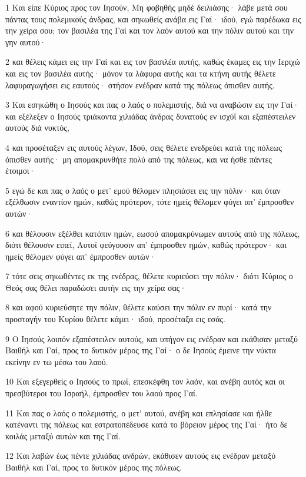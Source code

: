 \par 1 Και είπε Κύριος προς τον Ιησούν, Μη φοβηθής μηδέ δειλιάσης· λάβε μετά σου πάντας τους πολεμικούς άνδρας, και σηκωθείς ανάβα εις Γαί· ιδού, εγώ παρέδωκα εις την χείρα σου; τον βασιλέα της Γαί και τον λαόν αυτού και την πόλιν αυτού και την γην αυτού·
\par 2 και θέλεις κάμει εις την Γαί και εις τον βασιλέα αυτής, καθώς έκαμες εις την Ιεριχώ και εις τον βασιλέα αυτής· μόνον τα λάφυρα αυτής και τα κτήνη αυτής θέλετε λαφυραγωγήσει εις εαυτούς· στήσον ενέδραν κατά της πόλεως όπισθεν αυτής.
\par 3 Και εσηκώθη ο Ιησούς και πας ο λαός ο πολεμιστής, διά να αναβώσιν εις την Γαί· και εξέλεξεν ο Ιησούς τριάκοντα χιλιάδας άνδρας δυνατούς εν ισχύϊ και εξαπέστειλεν αυτούς διά νυκτός,
\par 4 και προσέταξεν εις αυτούς λέγων, Ιδού, σεις θέλετε ενεδρεύει κατά της πόλεως όπισθεν αυτής· μη απομακρυνθήτε πολύ από της πόλεως, και να ήσθε πάντες έτοιμοι·
\par 5 εγώ δε και πας ο λαός ο μετ' εμού θέλομεν πλησιάσει εις την πόλιν· και όταν εξέλθωσιν εναντίον ημών, καθώς πρότερον, τότε ημείς θέλομεν φύγει απ' έμπροσθεν αυτών·
\par 6 και θέλουσιν εξέλθει κατόπιν ημών, εωσού απομακρύνωμεν αυτούς από της πόλεως, διότι θέλουσιν ειπεί, Αυτοί φεύγουσιν απ' έμπροσθεν ημών, καθώς πρότερον· και ημείς θέλομεν φύγει απ' έμπροσθεν αυτών·
\par 7 τότε σεις σηκωθέντες εκ της ενέδρας, θέλετε κυριεύσει την πόλιν· διότι Κύριος ο Θεός σας θέλει παραδώσει αυτήν εις την χείρα σας·
\par 8 και αφού κυριεύσητε την πόλιν, θέλετε καύσει την πόλιν εν πυρί· κατά την προσταγήν του Κυρίου θέλετε κάμει· ιδού, προσέταξα εις εσάς.
\par 9 Ο Ιησούς λοιπόν εξαπέστειλεν αυτούς, και υπήγον εις ενέδραν και εκάθισαν μεταξύ Βαιθήλ και Γαί, προς το δυτικόν μέρος της Γαί· ο δε Ιησούς έμεινε την νύκτα εκείνην εν τω μέσω του λαού.
\par 10 Και εξεγερθείς ο Ιησούς το πρωΐ, επεσκέφθη τον λαόν, και ανέβη αυτός και οι πρεσβύτεροι του Ισραήλ, έμπροσθεν του λαού προς Γαί.
\par 11 Και πας ο λαός ο πολεμιστής, ο μετ' αυτού, ανέβη και επλησίασε και ήλθε κατέναντι της πόλεως και εστρατοπέδευσε κατά το βόρειον μέρος της Γαί· ήτο δε κοιλάς μεταξύ αυτών και της Γαί.
\par 12 Και λαβών έως πέντε χιλιάδας ανδρών, εκάθισεν αυτούς εις ενέδραν μεταξύ Βαιθήλ και Γαί, προς το δυτικόν μέρος της πόλεως.
